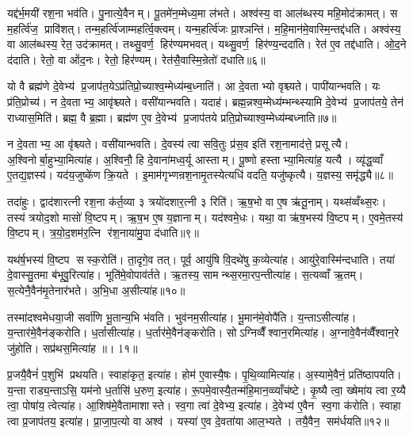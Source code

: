 यद्द॑र्भ॒मयी॑ रश॒ना भव॑ति। पु॒नात्ये॒वैनम्। पू॒तमे॑न॒म्मेध्य॒मा ल॑भते। अश्व॑स्य॒ वा आल॑ब्धस्य महि॒मोद॑क्रामत्। स म॒हर्त्वि॑ज॒ प्रावि॑शत्। तन्म॒हर्त्वि॑जाम्महर्त्वि॒क्त्वम्। यन्म॒हर्त्वि॑जः प्रा॒श्ञन्ति॑। म॒हि॒मान॑मे॒वास्मि॒न्तद्द॑धति। अश्व॑स्य॒ वा आल॑ब्धस्य॒ रेत॒ उद॑क्रामत्। तथ्सु॒वर्ण॒ हिर॑ण्यमभवत्। यथ्सु॒वर्ण॒ हिर॑ण्य॒न्ददा॑ति। रेत॑ ए॒व तद्द॑धाति। ओ॒द॒ने द॑दाति। रेतो॒ वा ओ॑द॒नः। रेतो॒ हिर॑ण्यम्। रेत॑सै॒वास्मि॒न्रेतो॑ दधाति॥६॥\anuvakamend[द॒धा॒ति॒ रु॒न्धे॒ द॒र्भा अ॑भव॒थ्षट् च॑]

यो वै ब्रह्म॑णे दे॒वेभ्य॑ प्र॒जाप॑त॒येऽप्र॑तिप्रो॒च्याश्व॒म्मेध्य॑म्ब॒ध्नाति॑। आ दे॒वताभ्यो वृश्च्यते। पापी॑यान्भवति। यः प्र॑ति॒प्रोच्य॑। न दे॒वताभ्य॒ आवृ॑श्च्यते। वसी॑यान्भवति। यदाह॑। ब्रह्म॒न्नश्व॒म्मेध्य॑म्भन्थ्स्यामि दे॒वेभ्य॑ प्र॒जाप॑तये॒ तेन॑ राध्यास॒मिति॑। ब्रह्म॒ वै ब्र॒ह्मा। ब्रह्म॑ण ए॒व दे॒वेभ्य॑ प्र॒जाप॑तये प्रति॒प्रोच्याश्व॒म्मेध्य॑म्बध्नाति॥७॥

न दे॒वताभ्य॒ आ वृ॑श्च्यते। वसी॑यान्भवति। दे॒वस्य॑ त्वा सवि॒तुः प्र॑स॒व इति॑ रश॒नामाद॑त्ते॒ प्रसूत्यै। अ॒श्विनोर्बा॒हुभ्या॒मित्या॑ह। अ॒श्विनौ॒ हि दे॒वाना॑मध्व॒र्यू आस्ताम्। पू॒ष्णो हस्ताभ्या॒मित्या॑ह॒ यत्यै। व्यृ॑द्ध॒व्वाँ ए॒तद्य॒ज्ञस्य॑। यद॑य॒जुष्के॑ण क्रि॒यते। इ॒माम॑गृभ्णन्रश॒नामृ॒तस्येत्यधि॑ वदति॒ यजु॑ष्कृत्यै। य॒ज्ञस्य॒ समृ॑द्ध्यै॥८॥

तदा॑हुः। द्वाद॑शारत्नी रश॒ना क॑र्त॒व्या ३ त्रयो॑दशार॒त्नी ३ रिति॑। ऋ॒ष॒भो वा ए॒ष ऋ॑तू॒नाम्। यथ्स॑व्वँथ्स॒रः। तस्य॑ त्रयोद॒शो मासो॑ वि॒ष्टपम्। ऋ॒ष॒भ ए॒ष य॒ज्ञानाम्। यद॑श्वमे॒धः। यथा॒ वा ऋ॑ष॒भस्य॑ वि॒ष्टपम्। ए॒वमे॒तस्य॑ वि॒ष्टपम्। त्र॒यो॒द॒शम॑र॒त्नि र॑श॒नाया॑मु॒पा द॑धाति॥९॥

यथ॑र्\mbox{}ष॒भस्य॑ वि॒ष्टप सस्क॒रोति॑। ता॒दृगे॒व तत्। पूर्व॒ आयु॑षि वि॒दथे॑षु क॒व्येत्या॑ह। आयु॑रे॒वास्मि॑न्दधाति। तया॑ दे॒वास्सु॒तमा ब॑भूवु॒रित्या॑ह। भूति॑मे॒वोपाव॑र्तते। ऋ॒तस्य॒ सामन्थ्स॒रमा॒रप॒न्तीत्या॑ह। स॒त्यव्वाँ ऋ॒तम्। स॒त्येनै॒वैन॑मृ॒तेनार॑भते। अ॒भि॒धा अ॒सीत्या॑ह॥१०॥

तस्मा॑दश्वमेधया॒जी सर्वा॑णि भू॒तान्य॒भि भ॑वति। भुव॑नम॒सीत्या॑ह। भू॒मान॑मे॒वोपै॑ति। य॒न्ताऽसीत्या॑ह। य॒न्तार॑मे॒वैन॑ङ्करोति। ध॒र्तासीत्या॑ह। ध॒र्तार॑मे॒वैन॑ङ्करोति। सोऽग्निव्वैँश्वान॒रमित्या॑ह। अ॒ग्नावे॒वैन॑व्वैँश्वान॒रे जु॑होति। सप्र॑थस॒मित्या॑ह ॥। 1१॥

प्र॒जयै॒वैनं॑ प॒शुभि॑ प्रथयति। स्वाहा॑कृत॒ इत्या॑ह। होम॑ ए॒वास्यै॒षः। पृ॒थि॒व्यामित्या॑ह। अ॒स्यामे॒वैनं॒ प्रति॑ष्ठापयति। य॒न्ता राड्य॒न्ताऽसि॒ यम॑नो ध॒र्तासि॑ ध॒रुण॒ इत्या॑ह। रू॒पमे॒वास्यै॒तन्म॑हि॒मान॒व्व्याँच॑ष्टे। कृ॒ष्यै त्वा॒ ख्षेमा॑य त्वा र॒य्यै त्वा॒ पोषा॑य॒ त्वेत्या॑ह। आ॒शिष॑मे॒वैतामाशास्ते। स्व॒गा त्वा॑ दे॒वेभ्य॒ इत्या॑ह। दे॒वेभ्य॑ ए॒वैन स्व॒गा क॑रोति। स्वाहा त्वा प्र॒जाप॑तय॒ इत्या॑ह। प्रा॒जा॒प॒त्यो वा अश्व॑। यस्या॑ ए॒व दे॒वता॑या आल॒भ्यते। तयै॒वैन॒ सम॑र्धयति॥१२॥\anuvakamend[ब॒ध्ना॒ति॒ समृ॑द्ध्या उ॒पाद॑धात्य॒सीत्या॑ह॒ सप्र॑थस॒मित्या॑ह दे॒वेभ्य॒ इत्या॑ह॒ पञ्च॑ च]

